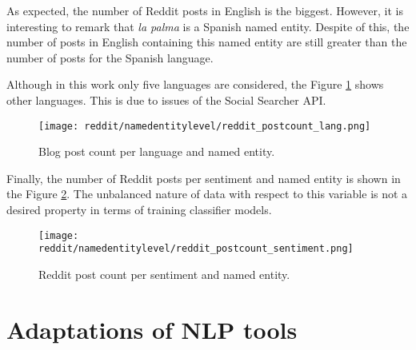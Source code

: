 \par As expected, the number of Reddit posts in English is the biggest. However, it is interesting to remark that \textit{la palma} is a Spanish named entity. Despite of this, the number of posts in English containing this named entity are still greater than the number of posts for the Spanish language. 
\par Although in this work only five languages are considered, the Figure \ref{fig:reddit_postcount_lang_entity} shows other languages. This is due to issues of the Social Searcher API.
\begin{figure}[H]
	\begin{center}
		\texttt{[image: reddit/namedentitylevel/reddit\_postcount\_lang.png]}
		\caption{Blog post count per language and named entity.}
		\label{fig:reddit_postcount_lang_entity}
	\end{center}
\end{figure}


\par Finally, the number of Reddit posts per sentiment and named entity is shown in the Figure \ref{fig:reddit_postcount_sentiment_entity}. The unbalanced nature of data with respect to this variable is not a desired property in terms of training classifier models.
\begin{figure}[H]
	\begin{center}
		\texttt{[image: reddit/namedentitylevel/reddit\_postcount\_sentiment.png]}
		\caption{Reddit post count per sentiment and named entity.}
		\label{fig:reddit_postcount_sentiment_entity}
	\end{center}
\end{figure}


\section{Adaptations of NLP tools}

